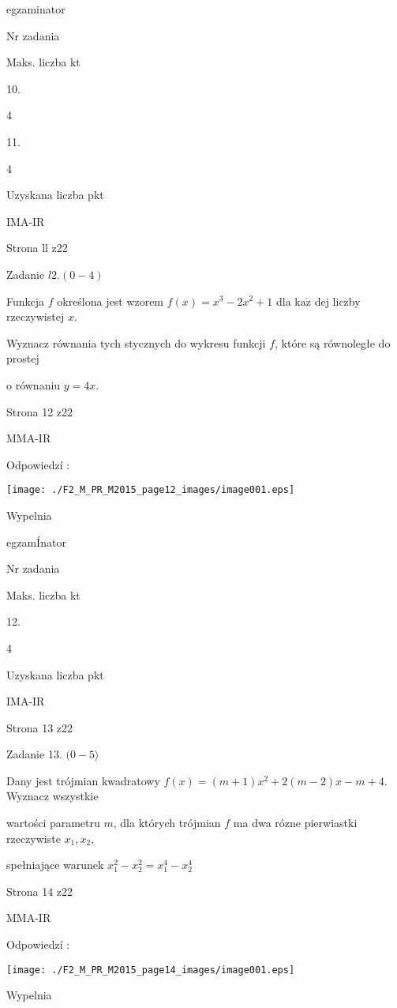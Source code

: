 \documentclass[a4paper,12pt]{article}
\begin{document}
egzaminator

Nr zadania

Maks. liczba kt

10.

4

11.

4

Uzyskana liczba pkt

IMA-IR

Strona ll z22





Zadanie $l2. (0-4)$

Funkcja $f$ określona jest wzorem $f(x)=x^{3}-2x^{2}+1$ dla $\mathrm{k}\mathrm{a}\dot{\mathrm{z}}$ dej liczby rzeczywistej $x.$

Wyznacz równania tych stycznych do wykresu funkcji $f$, które są równoległe do prostej

o równaniu $y=4x.$

Strona 12 z22

MMA-IR





Odpowiedzí :
\begin{center}
\texttt{[image: ./F2\_M\_PR\_M2015\_page12\_images/image001.eps]}
\end{center}
Wypelnia

egzamÍnator

Nr zadania

Maks. liczba kt

12.

4

Uzyskana liczba pkt

IMA-IR

Strona 13 z22





Zadanie 13. $(0-5\rangle$

Dany jest trójmian kwadratowy $f(x)=(m+1)x^{2}+2(m-2)x-m+4$. Wyznacz wszystkie

wartości parametru $m$, dla których trójmian $f$ ma dwa rózne pierwiastki rzeczywiste $x_{1}, x_{2},$

spełniające warunek $x_{1}^{2}-x_{2}^{2}=x_{1}^{4}-x_{2}^{4}$

Strona 14 z22

MMA-IR





Odpowiedzí :
\begin{center}
\texttt{[image: ./F2\_M\_PR\_M2015\_page14\_images/image001.eps]}
\end{center}
Wypelnia
\end{document}
